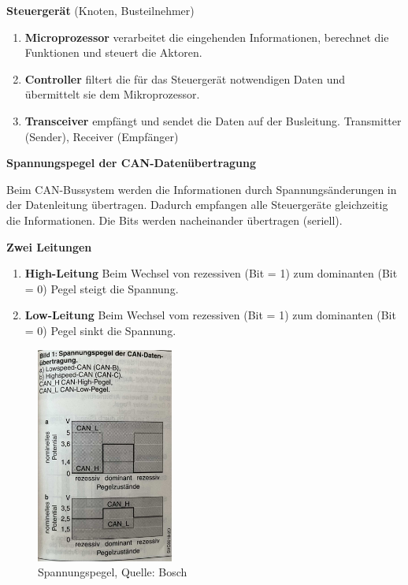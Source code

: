 \textbf{Steuergerät} (Knoten, Busteilnehmer)

\begin{enumerate}
\item
  \textbf{Microprozessor} verarbeitet die eingehenden Informationen,
  berechnet die Funktionen und steuert die Aktoren.
\item
  \textbf{Controller} filtert die für das Steuergerät notwendigen Daten
  und übermittelt sie dem Mikroprozessor.
\item
  \textbf{Transceiver} empfängt und sendet die Daten auf der Busleitung.
  Transmitter (Sender), Receiver (Empfänger)
\end{enumerate}

\newpage

\textbf{Spannungspegel der CAN-Datenübertragung}

Beim CAN-Bussystem werden die Informationen durch Spannungsänderungen in
der Datenleitung übertragen. Dadurch empfangen alle Steuergeräte
gleichzeitig die Informationen. Die Bits werden nacheinander übertragen
(seriell).

\textbf{Zwei Leitungen}

\begin{enumerate}
\item
  \textbf{High-Leitung} Beim Wechsel von rezessiven (Bit = 1) zum
  dominanten (Bit = 0) Pegel steigt die Spannung.
\item
  \textbf{Low-Leitung} Beim Wechsel vom rezessiven (Bit = 1) zum
  dominanten (Bit = 0) Pegel sinkt die Spannung.
\end{enumerate}

\begin{figure}[!ht]%
\centering
\includegraphics[width=0.4\textwidth]{images/CAN-Bus/CAN-Bus-11.pdf}
\caption{Spannungspegel, Quelle: Bosch}
\end{figure}

